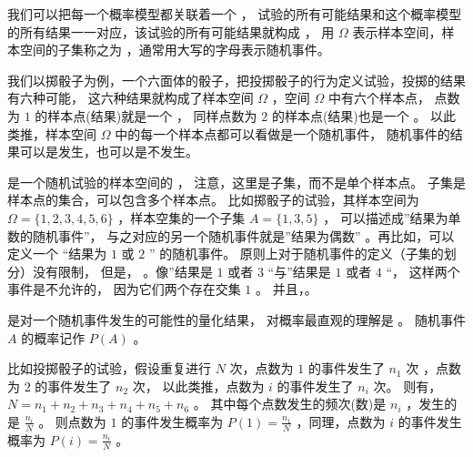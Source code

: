 \documentclass[letterpaper,10pt,english]{sphinxmanual}
\begin{document}
我们可以把每一个概率模型都关联着一个 ，
试验的所有可能结果和这个概率模型的所有结果一一对应，该试验的所有可能结果就构成 ，
用 \(\Omega\) 表示样本空间，样本空间的子集称之为 ，通常用大写的字母表示随机事件。

我们以掷骰子为例，一个六面体的骰子，把投掷骰子的行为定义试验，投掷的结果有六种可能，
这六种结果就构成了样本空间 \(\Omega\) ，空间 \(\Omega\) 中有六个样本点，
点数为 \(1\) 的样本点(结果)就是一个 ，
同样点数为 \(2\) 的样本点(结果)也是一个 。
以此类推，样本空间 \(\Omega\) 中的每一个样本点都可以看做是一个随机事件，
随机事件的结果可以是发生，也可以是不发生。

 是一个随机试验的样本空间的  ，
注意，这里是子集，而不是单个样本点。
子集是样本点的集合，可以包含多个样本点。
比如掷骰子的试验，其样本空间为 \(\Omega=\{1,2,3,4,5,6\}\)
，样本空集的一个子集 \(A=\{1,3,5\}\) ，
可以描述成”结果为单数的随机事件”，
与之对应的另一个随机事件就是”结果为偶数”
。再比如，可以定义一个 “结果为 \(1\) 或 \(2\) ”
的随机事件。
原则上对于随机事件的定义（子集的划分）没有限制，
但是，
。像”结果是 \(1\) 或者 \(3\) “与”结果是 \(1\) 或者 \(4\) “，
这样两个事件是不允许的，
因为它们两个存在交集 \(1\) 。
并且，。

 是对一个随机事件发生的可能性的量化结果，
对概率最直观的理解是  。
随机事件 \(A\) 的概率记作 \(P(A)\) 。

比如投掷骰子的试验，假设重复进行 \(N\) 次，点数为 \(1\) 的事件发生了 \(n_1\) 次
，点数为 \(2\) 的事件发生了 \(n_2\) 次，
以此类推，点数为 \(i\) 的事件发生了 \(n_i\) 次。
则有，\(N=n_1+n_2+n_3+n_4+n_5+n_6\) 。
其中每个点数发生的频次(数)是 \(n_i\)
，发生的  是 \(\frac{n_i}{N}\) 。
则点数为 \(1\) 的事件发生概率为 \(P(1)=\frac{n_1}{N}\)
，同理，点数为 \(i\) 的事件发生概率为 \(P(i)=\frac{n_i}{N}\) 。
\end{document}
